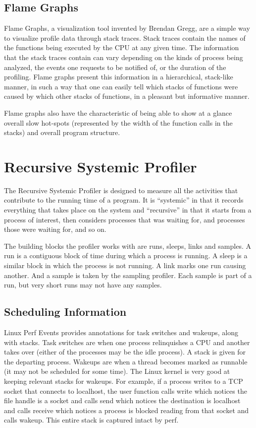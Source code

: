 \documentclass[10pt]{article}
\begin{document}
\subsection{Flame Graphs}
Flame Graphs, a visualization tool invented by Brendan Gregg, are a simple way to visualize profile data through stack traces. Stack traces contain the names of the functions being executed by the CPU at any given time. The information that the stack traces contain can vary depending on the kinds of process being analyzed, the events one requests to be notified of, or the duration of the profiling. Flame graphs present this information in a hierarchical, stack-like manner, in such a way that one can easily tell which stacks of functions were caused by which other stacks of functions, in a pleasant but informative manner.

Flame graphs also have the characteristic of being able to show at a glance overall slow hot-spots (represented by the width of the function calls in the stacks) and overall program structure.


\section{Recursive Systemic Profiler}

The Recursive Systemic Profiler is designed to measure all the activities that contribute to the running time of a program.  It is ``systemic'' in that it records everything that takes place on the system and ``recursive'' in that it starts from a process of interest, then considers processes that was waiting for, and processes those were waiting for, and so on.

The building blocks the profiler works with are runs, sleeps, links and samples.  A run is a contiguous block of time during which a process is running.  A sleep is a similar block in which the process is not running.  A link marks one run causing another.  And a sample is taken by the sampling profiler.  Each sample is part of a run, but very short runs may not have any samples.

\subsection{Scheduling Information}

Linux Perf Events provides annotations for task switches and wakeups, along with stacks.  Task switches are when one process relinquishes a CPU and another takes over (either of the processes may be the idle process).  A stack is given for the departing process.  Wakeups are when a thread becomes marked as runnable (it may not be scheduled for some time).  The Linux kernel is very good at keeping relevant stacks for wakeups.  For example, if a process writes to a TCP socket that connects to localhost, the user function calls write which notices the file handle is a socket and calls send which notices the destination is localhost and calls receive which notices a process is blocked reading from that socket and calls wakeup.  This entire stack is captured intact by perf.
\end{document}
